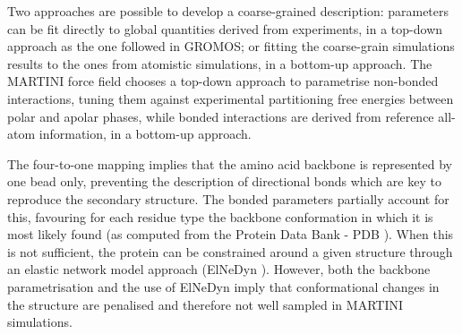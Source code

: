 Two approaches are possible to develop a coarse-grained description: parameters can be fit directly to global quantities derived from experiments, in a top-down approach as the one followed in GROMOS; or fitting the coarse-grain simulations results to the ones from atomistic simulations, in a bottom-up approach.
%
The MARTINI force field chooses a top-down approach to parametrise non-bonded interactions, tuning them against experimental partitioning free energies between polar and apolar phases, while bonded interactions are derived from reference all-atom information, in a bottom-up approach.

The four-to-one mapping implies that the amino acid backbone is represented by one bead only, preventing the description of directional bonds which are key to reproduce the secondary structure. The bonded parameters partially account for this, favouring for each residue type the backbone conformation in which it is most likely found (as computed from the Protein Data Bank - PDB \cite{PDB}). When this is not sufficient, the protein can be constrained around a given structure through an elastic network model approach (ElNeDyn \cite{Periole2009}). However, both the backbone parametrisation and the use of ElNeDyn imply that conformational changes in the structure are penalised and therefore not well sampled in MARTINI simulations.


